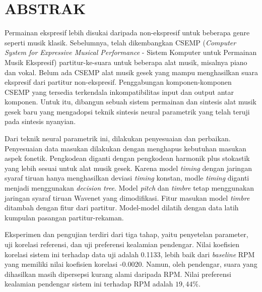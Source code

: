 \clearpage
\chapter*{ABSTRAK}
\begin{singlespace}

Permainan ekspresif lebih disukai daripada non-ekspresif untuk beberapa genre seperti musik klasik. Sebelumnya, telah dikembangkan CSEMP (\textit{Computer System for Expressive Musical Performance} - Sistem Komputer untuk Permainan Musik Ekspresif) partitur-ke-suara untuk beberapa alat musik, misalnya piano dan vokal. Belum ada CSEMP alat musik gesek yang mampu menghasilkan suara ekspresif dari partitur non-ekspresif. Penggabungan komponen-komponen CSEMP yang tersedia terkendala inkompatibilitas input dan output antar komponen. Untuk itu, dibangun sebuah sistem permainan dan sintesis alat musik gesek baru yang mengadopsi teknik sintesis neural parametrik yang telah teruji pada sintesis nyanyian.

Dari teknik neural parametrik ini, dilakukan penyesuaian dan perbaikan. Penyesuaian data masukan dilakukan dengan menghapus kebutuhan masukan aspek fonetik. Pengkodean diganti dengan pengkodean harmonik plus stokastik yang lebih sesuai untuk alat musik gesek. Karena model \textit{timing} dengan jaringan syaraf tiruan hanya menghasilkan deviasi \textit{timing} konstan, modle \textit{timing} diganti menjadi menggunakan \textit{decision tree}. Model \textit{pitch} dan \textit{timbre} tetap menggunakan jaringan syaraf tiruan Wavenet yang dimodifikasi. Fitur masukan model \textit{timbre} ditambah dengan fitur dari partitur. Model-model dilatih dengan data latih kumpulan pasangan partitur-rekaman.

Eksperimen dan pengujian terdiri dari tiga tahap, yaitu penyetelan parameter, uji korelasi referensi, dan uji preferensi kealamian pendengar. Nilai koefisien korelasi sistem ini terhadap data uji adalah 0.1133, lebih baik dari \textit{baseline} RPM yang memiliki nilai koefisien korelasi -0.0020. Namun, oleh pendengar, suara yang dihasilkan masih dipersepsi kurang alami daripada RPM. Nilai preferensi kealamian pendengar sistem ini terhadap RPM adalah $19,44\%$.


\end{singlespace}
\clearpage